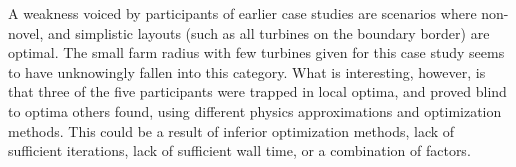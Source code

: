 	A weakness voiced by participants of earlier case studies are scenarios where non-novel, and simplistic layouts (such as all turbines on the boundary border) are optimal.
	The small farm radius with few turbines given for this case study seems to have unknowingly fallen into this category.
	What is interesting, however, is that three of the five participants were trapped in local optima, and proved blind to optima others found, using different physics approximations and optimization methods.
	This could be a result of inferior optimization methods, lack of sufficient iterations, lack of sufficient wall time, or a combination of factors.

